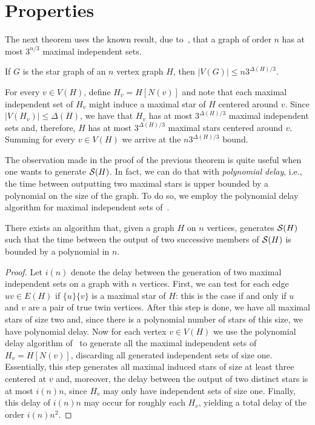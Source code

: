 \section{Properties}
The next theorem uses the known result, due to~\cite{moon_moser}, that a graph of order $n$ has at most $3^{n/3}$ maximal independent sets.

\begin{theorem}
    If $G$ is the star graph of an $n$ vertex graph $H$, then $|V(G)| \leq n3^{\Delta(H)/3}$.
\end{theorem}

\begin{tproof}
    For every $v \in V(H)$, define $H_v = H[N(v)]$ and note that each maximal independent set of $H_v$ might induce a maximal star of $H$ centered around $v$.
    Since $|V(H_v)| \leq \Delta(H)$, we have that $H_v$ has at most $3^{\Delta(H)/3}$ maximal independent sets and, therefore, $H$ has at most $3^{\Delta(H)/3}$ maximal stars centered around $v$.
    Summing for every $v \in V(H)$ we arrive at the $n3^{\Delta(H)/3}$ bound.
\end{tproof}

The observation made in the proof of the previous theorem is quite useful when one wants to generate $\mathcal{S}(H)$.
In fact, we can do that with \textit{polynomial delay}, i.e., the time between outputting two maximal stars is upper bounded by a polynomial on the size of the graph.
To do so, we employ the polynomial delay algorithm for maximal independent sets of~\cite{independent_poly_delay}.

\begin{theorem}
    There exists an algorithm that, given a graph $H$ on $n$ vertices, generates $\mathcal{S}(H)$ such that the time between the output of two successive members of $\mathcal{S}(H)$ is bounded by a polynomial in $n$.
\end{theorem}

\begin{proof}
    Let $i(n)$ denote the delay between the generation of two maximal independent sets on a graph with $n$ vertices.
    First, we can test for each edge $uv \in E(H)$ if $\{u\}\{v\}$ is a maximal star of $H$: this is the case if and only if $u$ and $v$ are a pair of true twin vertices.
    After this step is done, we have all maximal stars of size two and, since there is a polynomial number of stars of this size, we have polynomial delay.
    Now for each vertex $v \in V(H)$ we use the polynomial delay algorithm of~\cite{independent_poly_delay} to generate all the maximal independent sets of $H_v = H[N(v)]$, discarding all generated independent sets of size one.
    Essentially, this step generates all maximal induced stars of size at least three centered at $v$ and, moreover, the delay between the output of two distinct stars is at most $i(n)n$, since $H_v$ may only have independent sets of size one.
    Finally, this delay of $i(n)n$ may occur for roughly each $H_v$, yielding a total delay of the order $i(n)n^2$.
\end{proof}

